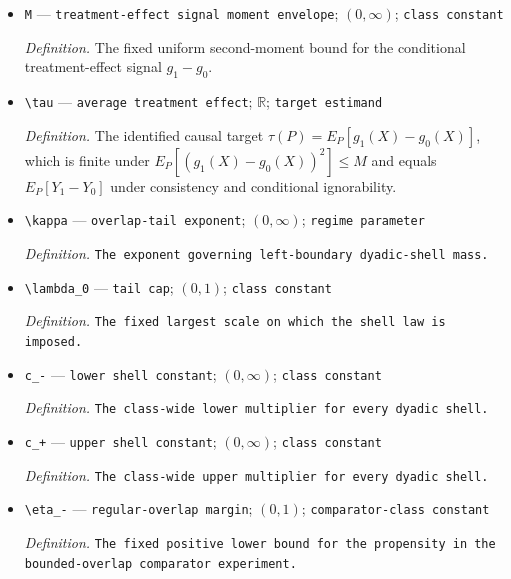 \documentclass{article}
\begin{document}
\begin{itemize}
  \par\smallskip\noindent\emph{Definition.} A deterministic function supplied with the experiment as a global approximation to \(e\).
  \item \texttt{M} --- \texttt{treatment-\allowbreak{}effect signal moment envelope}; \((0,\infty)\); \texttt{class constant}
  \par\smallskip\noindent\emph{Definition.} The fixed uniform second-moment bound for the conditional treatment-effect signal \(g_1-g_0\).
  \item \texttt{\textbackslash{}\allowbreak{}tau} --- \texttt{average treatment effect}; \(\mathbb R\); \texttt{target estimand}
  \par\smallskip\noindent\emph{Definition.} The identified causal target \(\tau(P)=E_P[g_1(X)-g_0(X)]\), which is finite under \(E_P[(g_1(X)-g_0(X))^2]\le M\) and equals \(E_P[Y_1-Y_0]\) under consistency and conditional ignorability.
  \item \texttt{\textbackslash{}\allowbreak{}kappa} --- \texttt{overlap-\allowbreak{}tail exponent}; \((0,\infty)\); \texttt{regime parameter}
  \par\smallskip\noindent\emph{Definition.} \texttt{The exponent governing left-\allowbreak{}boundary dyadic-\allowbreak{}shell mass.}
  \item \texttt{\textbackslash{}\allowbreak{}lambda\_\allowbreak{}0} --- \texttt{tail cap}; \((0,1)\); \texttt{class constant}
  \par\smallskip\noindent\emph{Definition.} \texttt{The fixed largest scale on which the shell law is imposed.}
  \item \texttt{c\_\allowbreak{}-\allowbreak{}} --- \texttt{lower shell constant}; \((0,\infty)\); \texttt{class constant}
  \par\smallskip\noindent\emph{Definition.} \texttt{The class-\allowbreak{}wide lower multiplier for every dyadic shell.}
  \item \texttt{c\_\allowbreak{}+\allowbreak{}} --- \texttt{upper shell constant}; \((0,\infty)\); \texttt{class constant}
  \par\smallskip\noindent\emph{Definition.} \texttt{The class-\allowbreak{}wide upper multiplier for every dyadic shell.}
  \item \texttt{\textbackslash{}\allowbreak{}eta\_\allowbreak{}-\allowbreak{}} --- \texttt{regular-\allowbreak{}overlap margin}; \((0,1)\); \texttt{comparator-\allowbreak{}class constant}
  \par\smallskip\noindent\emph{Definition.} \texttt{The fixed positive lower bound for the propensity in the bounded-\allowbreak{}overlap comparator experiment.}

\end{itemize}
\end{document}
